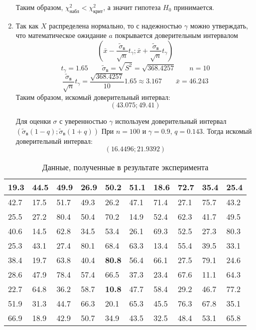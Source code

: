\documentclass{article}
\theoremstyle{problemstyle}
\begin{document}
\begin{enumerate}
    Таким образом, \(\chi^2_\text{набл} < \chi^2_\text{крит}\), а значит гипотеза
    \(H_0\) принимается.

  \item Так как \(X\) распределена нормально, то с надежностью \(\gamma\)
    можно утверждать, что математическое ожидание \(a\) покрывается
    доверительным интервалом
    \[
      \left(
      \bar x - \frac{\tilde\sigma_\text{в}}{\sqrt{n}} t_\gamma
      ;
      \bar x + \frac{\tilde\sigma_\text{в}}{\sqrt{n}} t_\gamma
      \right)
    \]
    \[
      t_\gamma = 1.65
      \qquad
      \tilde\sigma_\text{в} = \sqrt{S^2} = \sqrt{368.4257}
      \qquad
      n = 10
    \]
    \[
      \frac{\tilde\sigma_\text{в}}{\sqrt{n}} t_\gamma = \frac{\sqrt{368.4257}}{10} 1.65 \approx 3.167
      \qquad
      \bar x = 46.243
    \]
    Таким образом, искомый доверительный интервал:
    \[
      (43.075; 49.41)
    \]

    Для оценки $\sigma$ с уверенностью $\gamma$ используем
    доверительный интервал \( (\tilde\sigma_\text{в} (1 - q); \tilde\sigma_\text{в} (1+q)) \)
    При $n = 100$ и $\gamma = 0.9$, $q = 0.143$. Тогда искомый доверительный интервал:
    \[ (16.4496; 21.9392) \]
\end{enumerate}

\begin{table}[H]
  \centering
  \begin{tabular}{|l|l|l|l|l|l|l|l|l|l|}
    \hline
    19.3 & 44.5 & 49.9 & 26.9 & 50.2 & 51.1 & 18.6 & 72.7 & 35.4 & 25.4 \\
    \hline
    42.7 & 17.5 & 51.7 & 49.3 & 26.2 & 47.1 & 71.4 & 27.1 & 75.7 & 43.2 \\
    \hline
    25.5 & 27.2 & 80.4 & 50.4 & 70.2 & 14.9 & 52.4 & 62.3 & 41.7 & 49.5 \\ 
    \hline
    40.6 & 14.5 & 62.8 & 34.5 & 53.4 & 26.1 & 69.3 & 52.5 & 27.3 & 80.3 \\
    \hline
    25.3 & 43.1 & 27.4 & 80.1 & 68.4 & 63.3 & 13.4 & 55.4 & 39.5 & 33.1 \\ 
    \hline
    38.4 & 19.7 & 63.8 & 40.4 & \textbf{80.8} & 56.4 & 66.1 & 27.5 & 79.1 & 24.6 \\
    \hline
    28.6 & 47.9 & 78.4 & 57.4 & 66.5 & 37.3 & 23.4 & 67.6 & 11.1 & 64.3 \\
    \hline
    22.7 & 64.8 & 36.2 & 58.7 & \textbf{10.8} & 47.7 & 58.4 & 29.2 & 46.7 & 77.2 \\
    \hline
    51.9 & 31.3 & 44.7 & 66.3 & 20.1 & 65.3 & 45.5 & 76.3 & 67.8 & 35.1 \\
    \hline
    66.9 & 18.9 & 42.9 & 50.7 & 34.9 & 43.5 & 32.5 & 48.4 & 53.1 & 65.8 \\
    \hline
  \end{tabular}
  \caption{Данные, полученные в результате эксперимента}\label{table:data}
\end{table}
\end{document}
